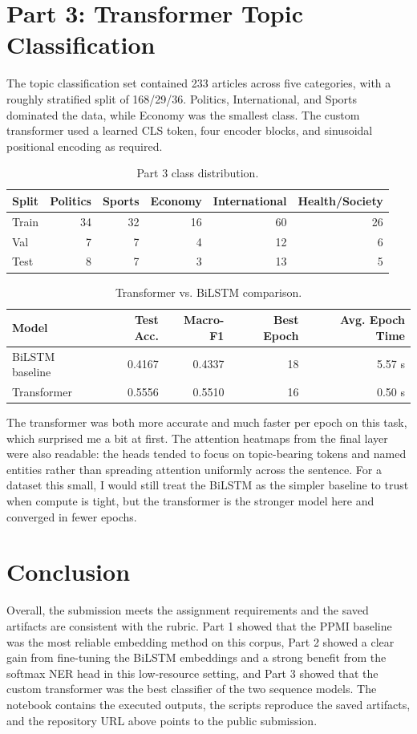 \documentclass[12pt]{article}
\begin{document}
\section{Part 3: Transformer Topic Classification}
The topic classification set contained 233 articles across five categories, with a roughly stratified split of 168/29/36. Politics, International, and Sports dominated the data, while Economy was the smallest class. The custom transformer used a learned CLS token, four encoder blocks, and sinusoidal positional encoding as required.

\begin{table}[h]
\centering
\small
\begin{tabular}{@{}lrrrrr@{}}
\toprule
Split & Politics & Sports & Economy & International & Health/Society \\
\midrule
Train & 34 & 32 & 16 & 60 & 26 \\
Val & 7 & 7 & 4 & 12 & 6 \\
Test & 8 & 7 & 3 & 13 & 5 \\
\bottomrule
\end{tabular}
\caption{Part 3 class distribution.}
\end{table}

\begin{table}[h]
\centering
\small
\begin{tabular}{@{}lrrrr@{}}
\toprule
Model & Test Acc. & Macro-F1 & Best Epoch & Avg. Epoch Time \\
\midrule
BiLSTM baseline & 0.4167 & 0.4337 & 18 & 5.57 s \\
Transformer & 0.5556 & 0.5510 & 16 & 0.50 s \\
\bottomrule
\end{tabular}
\caption{Transformer vs. BiLSTM comparison.}
\end{table}

The transformer was both more accurate and much faster per epoch on this task, which surprised me a bit at first. The attention heatmaps from the final layer were also readable: the heads tended to focus on topic-bearing tokens and named entities rather than spreading attention uniformly across the sentence. For a dataset this small, I would still treat the BiLSTM as the simpler baseline to trust when compute is tight, but the transformer is the stronger model here and converged in fewer epochs.

\section{Conclusion}
Overall, the submission meets the assignment requirements and the saved artifacts are consistent with the rubric. Part 1 showed that the PPMI baseline was the most reliable embedding method on this corpus, Part 2 showed a clear gain from fine-tuning the BiLSTM embeddings and a strong benefit from the softmax NER head in this low-resource setting, and Part 3 showed that the custom transformer was the best classifier of the two sequence models. The notebook contains the executed outputs, the scripts reproduce the saved artifacts, and the repository URL above points to the public submission.
\end{document}
